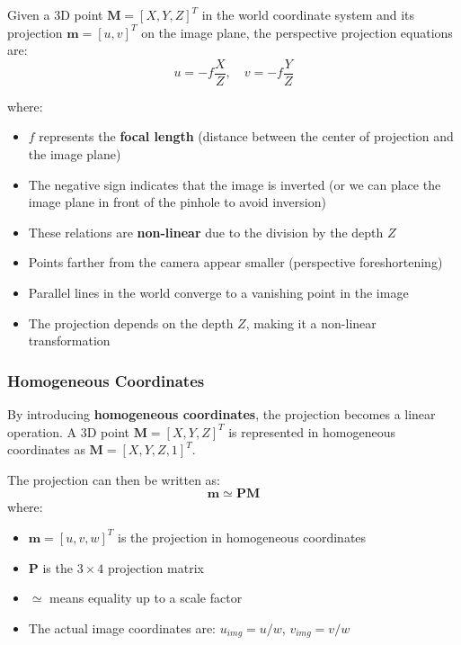 \documentclass[11pt,a4paper]{article}
\theoremstyle{definition}
\theoremstyle{plain}
\theoremstyle{remark}
\begin{document}
Given a 3D point $\mathbf{M} = [X, Y, Z]^T$ in the world coordinate system and its projection $\mathbf{m} = [u, v]^T$ on the image plane, the perspective projection equations are:
\begin{equation} \label{eq:perspective_projection}
    u = -f \frac{X}{Z}, \quad v = -f \frac{Y}{Z}
\end{equation}

where:
\begin{itemize}
    \item $f$ represents the \textbf{focal length} (distance between the center of projection and the image plane)
    \item The negative sign indicates that the image is inverted (or we can place the image plane in front of the pinhole to avoid inversion)
    \item These relations are \textbf{non-linear} due to the division by the depth $Z$
\end{itemize}

\begin{tcolorbox}[colback=orange!5!white,colframe=orange!75!black,title=\textbf{Perspective Projection Properties}]
\begin{itemize}
    \item Points farther from the camera appear smaller (perspective foreshortening)
    \item Parallel lines in the world converge to a vanishing point in the image
    \item The projection depends on the depth $Z$, making it a non-linear transformation
\end{itemize}
\end{tcolorbox}

\subsubsection{Homogeneous Coordinates}

By introducing \textbf{homogeneous coordinates}, the projection becomes a linear operation. A 3D point $\mathbf{M} = [X, Y, Z]^T$ is represented in homogeneous coordinates as $\mathbf{M} = [X, Y, Z, 1]^T$.

The projection can then be written as:
\begin{equation} \label{eq:homogeneous_projection}
    \mathbf{m} \simeq \mathbf{P} \mathbf{M}
\end{equation}
where:
\begin{itemize}
    \item $\mathbf{m} = [u, v, w]^T$ is the projection in homogeneous coordinates
    \item $\mathbf{P}$ is the $3 \times 4$ projection matrix
    \item $\simeq$ means equality up to a scale factor
    \item The actual image coordinates are: $u_{img} = u/w$, $v_{img} = v/w$
\end{itemize}
\end{document}
